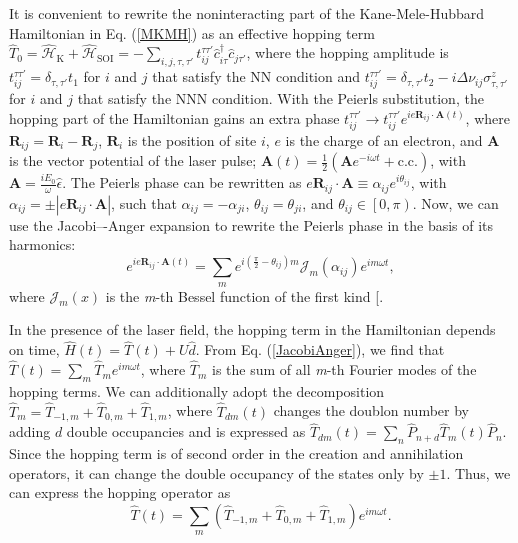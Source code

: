 \documentclass[aps,prl,twocolumn,amsmath,amssymb,nobibnotes]{revtex4-1}%
\renewcommand{\cite}[1]{{[}\onlinecite{#1}{]}}
\newcommand{\bs}{\boldsymbol}
\begin{document}
It is convenient to rewrite the noninteracting part of the Kane-Mele-Hubbard Hamiltonian in Eq. (\ref{MKMH}) as an effective hopping term $\hat{T}_0=\hat{\mathcal{H}}_{\text{K}}+\hat{\mathcal{H}}_{\text{SOI}} = - \sum_{i,j , \tau, \tau'}
t_{ij}^{\tau\tau'} \hat{c}_{i \tau}^\dagger \hat{c}_{j \tau'}$, where the hopping amplitude is $t_{ij}^{\tau\tau'} = \delta_{\tau,\tau'}t_1$ for $i$ and $j$ that satisfy the NN condition and $t_{ij}^{\tau\tau'} = \delta_{\tau,\tau'}t_2 - i\Delta\nu_{ij}\sigma^z_{\tau, \tau'}$ for $i$ and $j$ that satisfy the NNN condition. With the Peierls substitution, the hopping part of the Hamiltonian gains an extra phase $t_{ij}^{\tau\tau'}\rightarrow t_{ij}^{\tau\tau'} e^{{i e \bs{R}_{ij} \cdot \bs{A}(t)}}$, where $\bs{R}_{ij} = \bs{R}_i-\bs{R}_j$, $\bs{R}_i$ is the position of site $i$, $e$ is the charge of an electron, and $\bs{A}$ is the vector potential of the laser pulse; $\bs{A}(t) = \frac{1}{2}(\bs{A} e^{-i\omega t} + \mathrm{c.c.})$, with $\bs{A} = \frac{iE_0}{\omega}\hat{\epsilon}$.
The Peierls phase can be rewritten as $e\bs{R}_{ij}\cdot\bs{A} \equiv \alpha_{ij} e^{i \theta_{ij}}$, with $\alpha_{ij} = \pm|e\bs{R}_{ij}\cdot \bs{A}|$, such that $\alpha_{ij}= -\alpha_{ji}$, $\theta_{ij}= \theta_{ji}$, and $\theta_{ij} \in \left[0,\pi\right)$.
Now, we can use the Jacobi–-Anger expansion to rewrite the Peierls phase in the basis of its harmonics:
\begin{equation}
\label{JacobiAnger}
e^{ie\bs{R}_{ij}\cdot\bs{A}(t)} = \sum_m e^{i(\frac{\pi}{2}-\theta_{ij})m} \mathcal{J}_m(\alpha_{ij}) e^{im\omega t},
\end{equation}
where $\mathcal{J}_m(x)$ is the \textit{m}-th Bessel function of the first kind \cite{Kitamura2017}.

In the presence of the laser field, the hopping term in the Hamiltonian depends on time, $\hat{H}(t) = \hat{T}(t) +  U\hat{d}$. From Eq. (\ref{JacobiAnger}), we find that $\hat{T}(t) = \sum_m \hat{T}_m e^{im \omega t}$, where $\hat{T}_m$ is the sum of all \textit{m}-th Fourier modes of the hopping terms. We can additionally adopt the decomposition $\hat{T}_m = \hat{T}_{-1,m}+\hat{T}_{0,m}+\hat{T}_{1,m}$, where $\hat{T}_{dm}(t)$ changes the doublon number by adding $d$ double occupancies and is expressed as $\hat{T}_{dm}(t) = \sum_n \hat{P}_{n+d}\hat{T}_{m}(t)\hat{P}_n$. Since the hopping term is of second order in the creation and annihilation operators, it can change the double occupancy of the states only by $\pm1$. Thus, we can express the hopping operator as
\begin{equation}
\hat{T}(t) = \sum_m (\hat{T}_{-1,m}+\hat{T}_{0,m}+\hat{T}_{1,m})e^{im\omega t}.
\end{equation}
\end{document}
